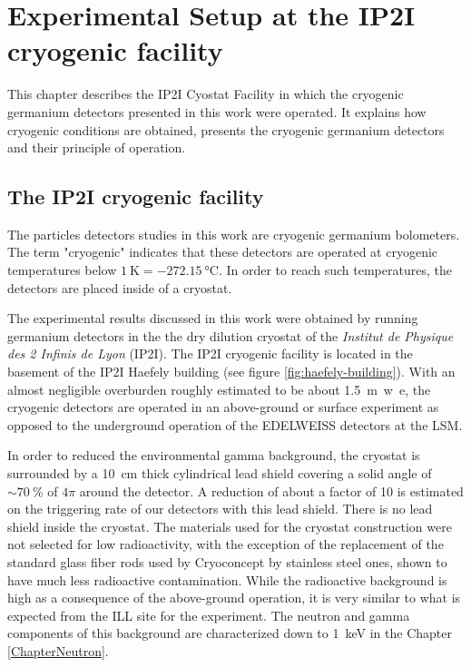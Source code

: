 
\chapter{Experimental Setup at the IP2I cryogenic facility} %

\label{ChapterExperiment} %


This chapter describes the IP2I Cyostat Facility in which the cryogenic germanium detectors presented in this work were operated. It explains how cryogenic conditions are obtained, presents the cryogenic germanium detectors and their principle of operation.

\section{The IP2I cryogenic facility}
\label{sec:IP2I-cryostat-facility} 

The particles detectors studies in this work are cryogenic germanium bolometers. The term "cryogenic" indicates that these detectors are operated at cryogenic temperatures below $\SI{1}{\kelvin} = \SI{-272,15}{\celsius}$. In order to reach such temperatures, the detectors are placed inside of a cryostat.

The experimental results discussed in this work were obtained by running germanium detectors in the the dry dilution cryostat of the \textit{Institut de Physique des 2 Infinis de Lyon} (IP2I). The IP2I cryogenic facility is located in the basement of the IP2I Haefely building (see figure \ref{fig:haefely-building}). With an almost negligible overburden roughly estimated to be about \SI{1.5}{m.w.e}, the cryogenic detectors are operated in an above-ground or surface experiment as opposed to the underground operation of the EDELWEISS detectors at the LSM.

In order to reduced the environmental gamma background, the cryostat is surrounded by a \SI{10}{\cm} thick cylindrical lead shield covering a solid angle of $\sim \SI{70}{\percent}$ of $4\pi$ around the detector. A reduction of about a factor of 10 is estimated on the triggering rate of our detectors with this lead shield.
There is no lead shield inside the cryostat. The materials used for the cryostat construction were not selected for low radioactivity, with the exception of the replacement of the standard glass fiber rods used by Cryoconcept by stainless steel ones, shown to have much less radioactive contamination. 
While the radioactive background is high as a consequence of the above-ground operation, it is very similar to what is expected from the ILL site for the \Ricochet{} experiment. The neutron and gamma components of this background are characterized down to \SI{1}{\kilo\eV} in the Chapter \ref{ChapterNeutron}.

